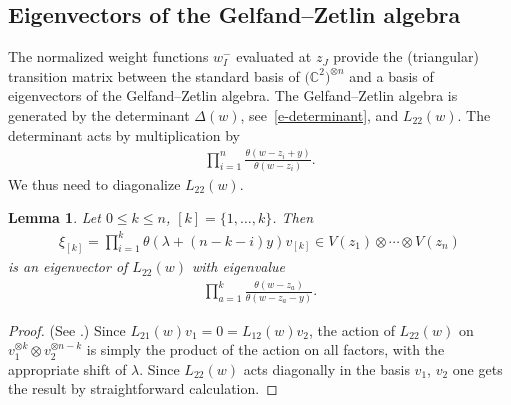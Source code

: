 \documentclass[10pt,a4paper]{amsart}
\numberwithin{equation}{section}
\newtheorem{Lemma}[Theorem]{Lemma}
\begin{document}
\subsection{Eigenvectors of the Gelfand--Zetlin algebra}\label{ss-3.10}
The normalized weight functions $w^-_I$ evaluated at $z_J$ provide the (triangular) transition matrix between the standard basis of $\big(\mathbb C^2\big)^{\otimes n}$ and a basis of eigenvectors of the Gelfand--Zetlin
algebra. The Gelfand--Zetlin algebra is generated by the determinant $\Delta(w)$, see~\eqref{e-determinant}, and $L_{22}(w)$. The determinant acts by multiplication by
\begin{gather*}
 \prod_{i=1}^n\frac{\theta(w-z_i+y)}{\theta(w-z_i)}.
\end{gather*}
 We thus need to diagonalize $L_{22}(w)$.
\begin{Lemma}\label{lemma-6} Let $0\leq k\leq n$, $[k]=\{1,\dots,k\}$. Then
 \begin{gather*}
 \xi_{[k]}= \prod_{i=1}^k\theta(\lambda+(n-k-i)y)v_{[k]}\in V(z_1)\otimes\cdots\otimes V(z_n)
 \end{gather*}
 is an eigenvector of $L_{22}(w)$ with eigenvalue
 \begin{gather*}
 \prod_{a=1}^k\frac{\theta(w-z_a)}{\theta(w-z_a-y)}.
 \end{gather*}
\end{Lemma}
\begin{proof} (See \cite{GRTV,RTV2,RV2}.) Since $L_{21}(w)v_1=0=L_{12}(w)v_2$, the action of $L_{22}(w)$ on $v_1^{\otimes k}\otimes v_2^{\otimes n-k}$ is simply the product of the action on all factors, with the appropriate shift of $\lambda$. Since $L_{22}(w)$ acts diagonally in the basis $v_1$, $v_2$ one gets the result by straightforward calculation.
\end{proof}
\end{document}
